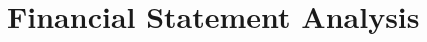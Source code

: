 \section{Financial Statement Analysis}



\newpage



\newpage



\newpage



\newpage



\newpage



\newpage



\newpage



